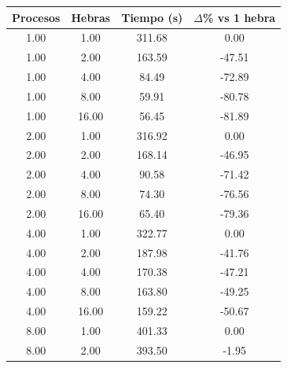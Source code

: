\begin{table}[ht]
    \centering
    \begin{tabular}{|c|c|c|c|}
        \hline
        \textbf{Procesos} & \textbf{Hebras} & \textbf{Tiempo (s)} & \textbf{$\Delta$\% vs 1 hebra} \\
        \hline
        1.00              & 1.00            & 311.68              & 0.00                           \\
        1.00              & 2.00            & 163.59              & -47.51                         \\
        1.00              & 4.00            & 84.49               & -72.89                         \\
        1.00              & 8.00            & 59.91               & -80.78                         \\
        1.00              & 16.00           & 56.45               & -81.89                         \\
        2.00              & 1.00            & 316.92              & 0.00                           \\
        2.00              & 2.00            & 168.14              & -46.95                         \\
        2.00              & 4.00            & 90.58               & -71.42                         \\
        2.00              & 8.00            & 74.30               & -76.56                         \\
        2.00              & 16.00           & 65.40               & -79.36                         \\
        4.00              & 1.00            & 322.77              & 0.00                           \\
        4.00              & 2.00            & 187.98              & -41.76                         \\
        4.00              & 4.00            & 170.38              & -47.21                         \\
        4.00              & 8.00            & 163.80              & -49.25                         \\
        4.00              & 16.00           & 159.22              & -50.67                         \\
        8.00              & 1.00            & 401.33              & 0.00                           \\
        8.00              & 2.00            & 393.50              & -1.95                          \\

\end{tabular}
\end{table}
